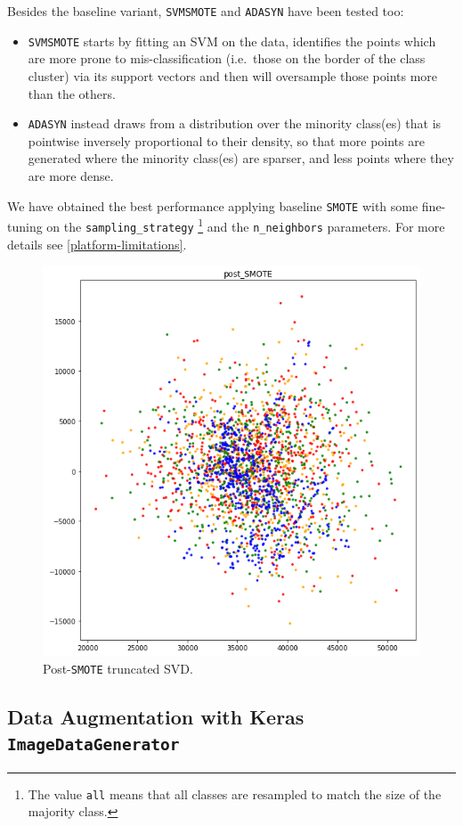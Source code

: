 \documentclass[aps,twocolumn,secnumarabic,nobalancelastpage,amsmath,amssymb,
nofootinbib]{revtex4}
\begin{document}
Besides the baseline variant, \texttt{SVMSMOTE} and \texttt{ADASYN} have
been tested too:

\begin{itemize}
\item
\texttt{SVMSMOTE} starts by fitting an SVM on the data, identifies the
points which are more prone to mis-classification (i.e.~those on the
border of the class cluster) via its support vectors and then will
oversample those points more than the others.
\vspace{-0.2cm}\item
\texttt{ADASYN} instead draws from a distribution over the minority
class(es) that is pointwise inversely proportional to their density,
so that more points are generated where the minority class(es) are
sparser, and less points where they are more dense.
\end{itemize}

We have obtained the best performance applying baseline \texttt{SMOTE}
with some fine-tuning on the \texttt{sampling\_strategy} \footnote{The
value \texttt{all} means that all classes are resampled to match the
size of the majority class.} and the \texttt{n\_neighbors} parameters.
For more details see \ref{platform-limitations}.

\begin{figure}[h]
	\centering
	\includegraphics[width=0.7\linewidth]{Images/TruncatedSVD_postSMOTE}
	\caption{Post-\texttt{SMOTE} truncated SVD.}\label{fig:post-smote}
\end{figure}

\subsection{Data Augmentation with Keras
		\texttt{ImageDataGenerator}\label{data-generator}}
\end{document}
